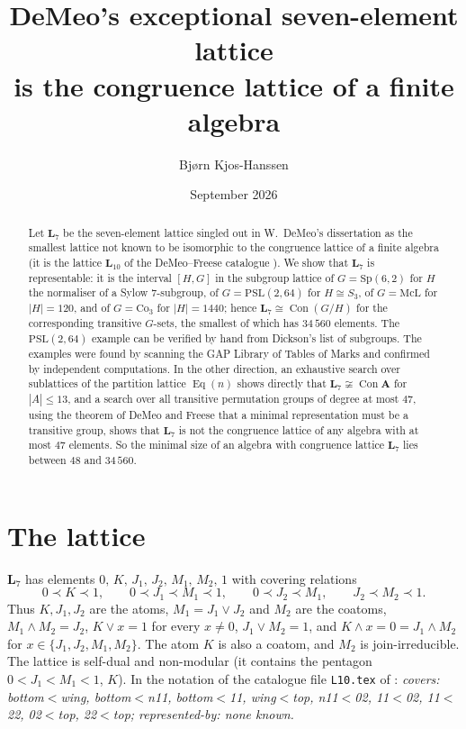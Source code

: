 \documentclass[11pt]{article}
\title{DeMeo's exceptional seven-element lattice\\is the congruence lattice of a finite algebra}
\author{Bj{\o}rn Kjos-Hanssen}
\date{September 2026}
\theoremstyle{remark}
\newcommand{\Con}{\operatorname{Con}}
\newcommand{\Eq}{\operatorname{Eq}}
\newcommand{\LL}{\mathbf{L}_7}
\begin{document}
\maketitle

\begin{abstract}
Let $\LL$ be the seven-element lattice singled out in W.~DeMeo's dissertation
\cite{DeMeo2012} as the smallest lattice not known to be isomorphic to the congruence
lattice of a finite algebra (it is the lattice $\mathbf L_{10}$ of the DeMeo--Freese
catalogue \cite{DeMeoFreese}). We show that $\LL$ is representable: it is the interval
$[H,G]$ in the subgroup lattice of $G=\mathrm{Sp}(6,2)$ for $H$ the normaliser of a Sylow
$7$-subgroup, of $G=\mathrm{PSL}(2,64)$ for $H\cong S_3$, of $G=\mathrm{McL}$ for
$|H|=120$, and of $G=\mathrm{Co}_3$ for $|H|=1440$; hence $\LL\cong\Con(G/H)$ for the
corresponding transitive $G$-sets, the smallest of which has $34\,560$ elements. The
$\mathrm{PSL}(2,64)$ example can be verified by hand from Dickson's list of subgroups.
The examples were found by scanning the GAP Library of Tables of Marks and confirmed by
independent computations. In the other direction, an exhaustive search over sublattices of the
partition lattice $\Eq(n)$ shows directly that $\LL\not\cong\Con\mathbf A$ for $|A|\le 13$,
and a search over all transitive permutation groups of degree at most $47$, using the theorem
of DeMeo and Freese that a minimal representation must be a transitive group, shows that
$\LL$ is not the congruence lattice of any algebra with at most $47$ elements. So the minimal
size of an algebra with congruence lattice $\LL$ lies between $48$ and $34\,560$.
\end{abstract}

\section{The lattice}

$\LL$ has elements $0,\,K,\,J_1,\,J_2,\,M_1,\,M_2,\,1$ with covering relations
\[
0\prec K\prec 1,\qquad 0\prec J_1\prec M_1\prec 1,\qquad 0\prec J_2\prec M_1,\qquad J_2\prec M_2\prec 1 .
\]
Thus $K,J_1,J_2$ are the atoms, $M_1=J_1\vee J_2$ and $M_2$ are the coatoms, $M_1\wedge M_2=J_2$,
$K\vee x=1$ for every $x\ne 0$, $J_1\vee M_2=1$, and $K\wedge x=0=J_1\wedge M_2$ for
$x\in\{J_1,J_2,M_1,M_2\}$. The atom $K$ is also a coatom, and $M_2$ is join-irreducible.
The lattice is self-dual and non-modular (it contains the pentagon $0<J_1<M_1<1$, $K$).
In the notation of the catalogue file \texttt{L10.tex} of \cite{DeMeoFreese}:
\emph{covers: bottom$<$wing, bottom$<$n11, bottom$<$11, wing$<$top, n11$<$02, 11$<$02, 11$<$22,
02$<$top, 22$<$top; represented-by: none known.}
\end{document}
